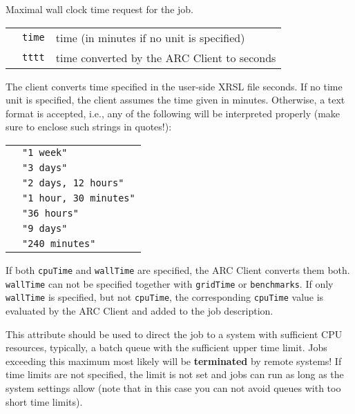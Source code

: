   Maximal wall clock time request for the job. 

  \begin{tabular}{llp{10cm}}
    \hspace*{1cm}&\texttt{time} & time (in minutes if no unit is specified)\\
    \hspace*{1cm}&\texttt{tttt} & time converted by the ARC Client to seconds\\
  \end{tabular}
  
  The client converts time specified in the user-side XRSL file seconds. If no time unit is specified,
  the client assumes the time given in minutes. Otherwise, a text
  format is accepted, i.e., any of the following will be interpreted
  properly (make sure to enclose such strings in quotes!):

  \begin{tabular}{ll}
    \hspace*{1cm}&\texttt{"1 week"}\\
    \hspace*{1cm}&\texttt{"3 days"}\\
    \hspace*{1cm}&\texttt{"2 days, 12 hours"}\\
    \hspace*{1cm}&\texttt{"1 hour, 30 minutes"}\\
    \hspace*{1cm}&\texttt{"36 hours"}\\
    \hspace*{1cm}&\texttt{"9 days"}\\
    \hspace*{1cm}&\texttt{"240 minutes"}\\
  \end{tabular}
 
  If both \texttt{cpuTime} and \texttt{wallTime} are specified, the ARC Client converts them both.
  \texttt{wallTime} can not be specified together with \texttt{gridTime}
  or \texttt{benchmarks}. If only \texttt{wallTime} is specified, but not \texttt{cpuTime},
  the corresponding  \texttt{cpuTime} value is evaluated by the ARC Client and added to the job description.
 
  \begin{framed}
    This attribute should be used to direct the job to a system with
    sufficient CPU resources, typically, a batch queue with the
    sufficient upper time limit. Jobs exceeding this maximum most
    likely will be \textbf{terminated} by remote systems! If 
    time limits are not specified, the limit is not set and jobs
    can run as long as the system settings allow (note that in this
    case you can not avoid queues with too short time limits).
  \end{framed}


